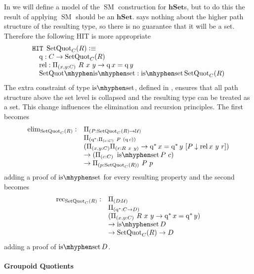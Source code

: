 \documentclass[12pt, parskip, DIV=14]{scrbook}
\newcommand{\defeq}{\vcentcolon\equiv}
\newcommand{\SM}{\operatorname{SM}}
\newcommand{\isset}{\operatorname{is\mhyphen set}}
\newcommand{\hSet}{\mathbf{hSet}}
\newcommand{\q}{\operatorname{q}}
\newcommand{\rel}{\operatorname{rel}}
\newcommand{\qs}{\operatorname{q}^*}
\newcommand{\SetQuot}{\operatorname{SetQuot}_C(R)}
\begin{document}
In  we will define a model of the $\SM$ construction for $\hSet$s, but to do this the result of applying $\SM$ should be an $\hSet$.  says nothing about the higher path structure of the resulting type, so there is no guarantee that it will be a set. Therefore the following HIT is more appropriate
\begin{equation}
\label{eqn:setquot}
\begin{array}{l}
  \mathtt{HIT}~\SetQuot \defeq \\
  \quad \q : C \to \SetQuot \\
  \quad \rel : \Pi_{(x,y : C)}~R~x~y \to \q x = \q y \\
  \quad \mathrm{SetQuot\mhyphen is\mhyphen set} : \isset \SetQuot
\end{array}
\end{equation}
The extra constraint of type $\isset$, defined in , ensures that all path structure above the set level is collapsed and the resulting type can be treated as a set. This change influences the elimination and recursion principles. The first becomes
$$
\begin{array}{rl}
  \mathrm{elim}_{\SetQuot} :& \Pi_{(P : \SetQuot \to \mathcal{U})} \\ &\Pi_{(\qs : \Pi_{(c :C)}~P~(\q c))} \\ & (\Pi_{(x , y : C)}\Pi_{(r : R~x~y)} \to \qs x = \qs y~[P \downarrow \rel x~y~r]) \\ &\to (\Pi_{(c : C)}~\isset P~c) \\ &\to \Pi_{(p : \SetQuot)}~P~p
\end{array}
$$
adding a proof of $\isset$ for every resulting property and the second becomes
$$
\begin{array}{rl}
  \mathrm{rec}_{\SetQuot} :& \Pi_{(D : \mathcal{U})} \\ &\Pi_{(\qs : C \to D)} \\ & (\Pi_{(x , y : C)}~R~x~y \to \qs x = \qs y) \\ &\to \isset D \\ &\to \SetQuot \to D
\end{array}
$$
adding a proof of $\isset D$.

\paragraph{Groupoid Quotients}
\end{document}
